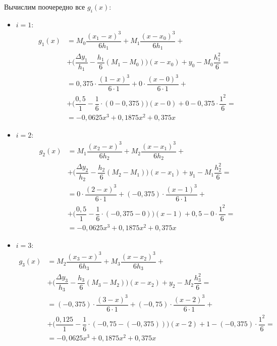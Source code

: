 \documentclass[a4paper, 12pt]{article}
\begin{document}
	Вычислим поочередно все $g_i(x)$:
	\begin{itemize}
		\item $i=1$:
		\begin{equation*}
			\begin{aligned}
			g_1(x)&=M_{0}\dfrac{(x_1-x)^3}{6h_1}+M_{1}\dfrac{(x-x_{0})^3}{6h_1}+\\&+\bigg(\dfrac{\Delta y_1}{h_1}-\dfrac{h_1}{6}(M_1-M_{0})\bigg)(x-x_0)+y_{0}-M_{0}\dfrac{h_1^2}{6}=\\
			&=0,375\cdot\dfrac{(1-x)^3}{6\cdot 1}+0\cdot \dfrac{(x-0)^3}{6\cdot 1}+\\&+\bigg(\dfrac{0,5}{1}-\dfrac{1}{6}\cdot(0-0,375)\bigg)(x-0)+0-0,375\cdot\dfrac{1^2}{6}=\\
			&=-0,0625x^3+0,1875x^2+0,375x
			\end{aligned}
		\end{equation*}
		\item $i=2$:
		\begin{equation*}
			\begin{aligned}
			g_2(x)&=M_{1}\dfrac{(x_2-x)^3}{6h_2}+M_{2}\dfrac{(x-x_{1})^3}{6h_2}+\\&+\bigg(\dfrac{\Delta y_2}{h_2}-\dfrac{h_2}{6}(M_2-M_{1})\bigg)(x-x_1)+y_{1}-M_{1}\dfrac{h_2^2}{6}=\\
			&=0\cdot\dfrac{(2-x)^3}{6\cdot 1}+(-0,375)\cdot \dfrac{(x-1)^3}{6\cdot 1}+\\&+\bigg(\dfrac{0,5}{1}-\dfrac{1}{6}\cdot(-0,375-0)\bigg)(x-1)+0,5-0\cdot\dfrac{1^2}{6}=\\
			&=-0,0625x^3+0,1875x^2+0,375x
			\end{aligned}
		\end{equation*}
		\item $i=3$:
		\begin{equation*}
			\begin{aligned}
			g_3(x)&=M_{2}\dfrac{(x_3-x)^3}{6h_3}+M_{3}\dfrac{(x-x_{2})^3}{6h_3}+\\&+\bigg(\dfrac{\Delta y_3}{h_3}-\dfrac{h_3}{6}(M_3-M_{2})\bigg)(x-x_2)+y_{2}-M_{2}\dfrac{h_3^2}{6}=\\
			&=(-0,375)\cdot\dfrac{(3-x)^3}{6\cdot 1}+(-0,75)\cdot \dfrac{(x-2)^3}{6\cdot 1}+\\&+\bigg(\dfrac{0,125}{1}-\dfrac{1}{6}\cdot(-0,75-(-0,375))\bigg)(x-2)+1-(-0,375)\cdot\dfrac{1^2}{6}=\\
			&=-0,0625x^3+0,1875x^2+0,375x
			\end{aligned}
		\end{equation*}
	\end{itemize}
	
\end{document}
